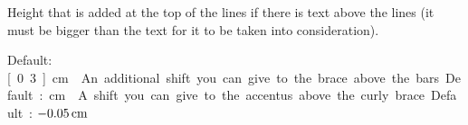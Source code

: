 Height that is added at the top of the lines if there is text above the lines (it must be bigger than the text for it to be taken into consideration).  

Default: \unit[0.3]{cm}

An additional shift you can give to the brace above the bars.  

Default: \unit[0]{cm}

A shift you can give to the accentus above the curly brace.  

Default: $\unit[-0.05]{cm}$

